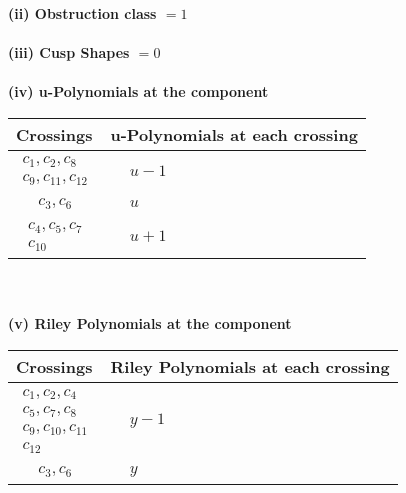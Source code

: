 \documentclass[1p]{elsarticle_modified}
\theoremstyle{definition}
\begin{document}
\flushleft \textbf{(ii) Obstruction class $= 1$}\\~\\
\flushleft \textbf{(iii) Cusp Shapes $= 0$}\\~\\
\newpage\renewcommand{\arraystretch}{1}
\flushleft \textbf{(iv) u-Polynomials at the component}\newline \\
\begin{tabular}{m{50pt}|m{274pt}}
Crossings & \hspace{64pt}u-Polynomials at each crossing \\
\hline $$\begin{aligned}c_{1},c_{2},c_{8}\\c_{9},c_{11},c_{12}\end{aligned}$$&$\begin{aligned}
&u-1
\end{aligned}$\\
\hline $$\begin{aligned}c_{3},c_{6}\end{aligned}$$&$\begin{aligned}
&u
\end{aligned}$\\
\hline $$\begin{aligned}c_{4},c_{5},c_{7}\\c_{10}\end{aligned}$$&$\begin{aligned}
&u+1
\end{aligned}$\\
\hline
\end{tabular}\\~\\
\newpage\renewcommand{\arraystretch}{1}
\flushleft \textbf{(v) Riley Polynomials at the component}\newline \\
\begin{tabular}{m{50pt}|m{274pt}}
Crossings & \hspace{64pt}Riley Polynomials at each crossing \\
\hline $$\begin{aligned}c_{1},c_{2},c_{4}\\c_{5},c_{7},c_{8}\\c_{9},c_{10},c_{11}\\c_{12}\end{aligned}$$&$\begin{aligned}
&y-1
\end{aligned}$\\
\hline $$\begin{aligned}c_{3},c_{6}\end{aligned}$$&$\begin{aligned}
&y
\end{aligned}$\\
\hline
\end{tabular}\\~\\
\end{document}
